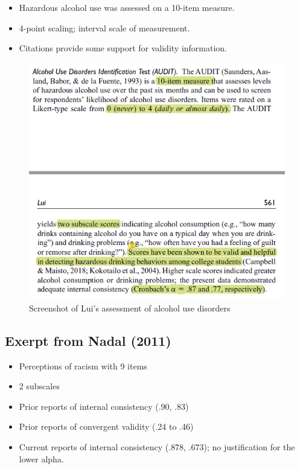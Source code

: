 \documentclass[
  english,
]{book}
\providecommand{\tightlist}{%
  \setlength{\itemsep}{0pt}\setlength{\parskip}{0pt}}
\begin{document}
\begin{itemize}
\tightlist
\item
  Hazardous alcohol use was assessed on a 10-item measure.
\item
  4-point scaling; interval scale of measurement.
\item
  Citations provide some support for validity information.
\end{itemize}

\begin{figure}
\centering
\includegraphics{images/PsychoM/Lui3.png}
\caption{Screenshot of Lui's assessment of alcohol use disorders}
\end{figure}

\hypertarget{exerpt-from-nadal-2011}{%
\subsection{Exerpt from Nadal (2011)}\label{exerpt-from-nadal-2011}}

\begin{itemize}
\tightlist
\item
  Perceptions of racism with 9 items
\item
  2 subscales
\item
  Prior reports of internal consistency (.90, .83)
\item
  Prior reports of convergent validity (.24 to .46)
\item
  Current reports of internal consistency (.878, .673); no justification for the lower alpha.
\end{itemize}
\end{document}
